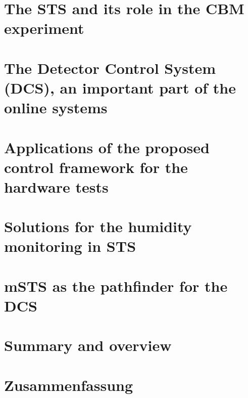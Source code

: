 \chapter{The STS and its role in the CBM experiment}
\label{chap:CBM_STS}

\chapter{The Detector Control System (DCS), an important part of the online systems}
\label{chap:online_systems}






\chapter{Applications of the proposed control framework for the hardware tests}
\label{chap:containers}



\chapter{Solutions for the humidity monitoring in STS}
\label{chap:fos}



\chapter{mSTS as the pathfinder for the DCS}
\label{chap:msts}
        

\chapter{Summary and overview}
\label{chap:last}


%
%
%
\chapter*{Zusammenfassung}

%

\renewcommand\listfigurename{List of Figures}
\listoffigures
{}
\renewcommand\listtablename{List of Tables}
\listoftables

{}
\printbibliography

\printglossaries



